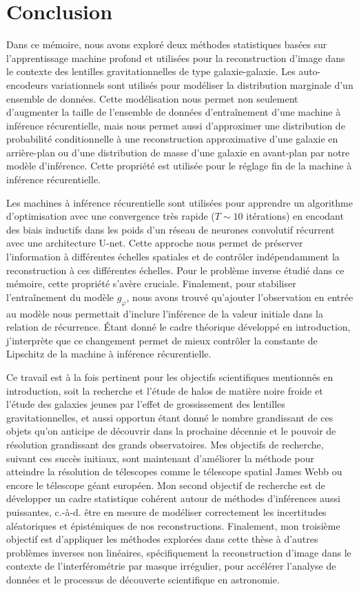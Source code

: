 \chapter{Conclusion}
Dans ce mémoire, nous avons exploré deux méthodes statistiques basées sur l'apprentissage machine profond et
utilisées pour la reconstruction d'image dans le contexte des lentilles gravitationnelles de type galaxie-galaxie.
Les auto-encodeurs variationnels sont utilisés pour modéliser la distribution marginale d'un 
ensemble de données. Cette modélisation nous permet non seulement d'augmenter la taille de l'ensemble 
de données d'entraînement d'une machine à inférence récurentielle, mais nous permet aussi d'approximer 
une distribution de probabilité conditionnelle à une reconstruction approximative d'une galaxie 
en arrière-plan ou d'une distribution de masse d'une galaxie en avant-plan par notre modèle d'inférence. 
Cette propriété est utilisée pour le réglage fin de la machine à inférence récurentielle.

Les machines à inférence récurentielle sont utilisées pour apprendre un algorithme d'optimisation avec une convergence 
très rapide ($T \sim 10$ itérations)
en encodant des biais inductifs dans les poids d'un réseau de neurones convolutif récurrent avec une architecture U-net. 
Cette approche nous permet de préserver l'information à différentes échelles spatiales et de contrôler indépendamment 
la reconstruction à ces différentes échelles. Pour le problème inverse étudié dans ce mémoire, cette propriété s'avère cruciale. 
Finalement, pour stabiliser l'entraînement du modèle $g_\varphi$, nous avons trouvé qu'ajouter l'observation 
en entrée au modèle nous permettait d'inclure l'inférence de la valeur initiale dans la relation de récurrence. Étant 
donné le cadre théorique développé en introduction, j'interprète que ce changement permet de mieux contrôler la constante de
Lipschitz de la machine à inférence récurentielle.

Ce travail est à la fois pertinent pour les objectifs scientifiques mentionnés en introduction, soit la recherche et l'étude 
de halos de matière noire froide et l'étude des galaxies jeunes par l'effet de grossissement des lentilles gravitationnelles, 
et aussi opportun étant donné le nombre grandissant de ces objets qu'on anticipe de découvrir dans la prochaine décennie et 
le pouvoir de résolution grandissant des grands observatoires. Mes objectifs de recherche, suivant ces succès initiaux, sont maintenant 
d'améliorer la méthode pour atteindre la résolution de télescopes comme le télescope spatial James Webb ou encore le télescope 
géant européen. Mon second objectif de recherche est de développer un cadre statistique cohérent autour de méthodes 
d'inférences aussi puissantes, c.-à-d. être en mesure de modéliser correctement les incertitudes aléatoriques et épistémiques 
de nos reconstructions. Finalement, mon troisième objectif est d'appliquer les méthodes explorées dans cette thèse à d'autres problèmes 
inverses non linéaires, spécifiquement la reconstruction d'image dans le contexte de l'interférométrie par masque irrégulier, 
pour accélérer l'analyse de données et le processus de découverte scientifique en astronomie.


